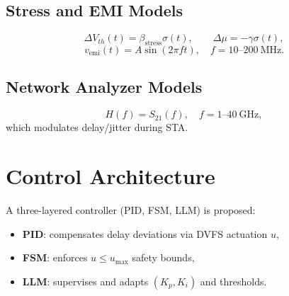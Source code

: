 \documentclass[conference]{IEEEtran}
\begin{document}
\subsection{Stress and EMI Models}
\begin{equation}
\Delta V_{th}(t)=\beta_{\mathrm{stress}}\sigma(t),\qquad \Delta\mu=-\gamma\sigma(t),
\end{equation}
\vspace{-6pt}
\begin{equation}
v_{\mathrm{emi}}(t)=A\sin(2\pi f t),\quad f=10\text{--}200~\mathrm{MHz}.
\end{equation}

\subsection{Network Analyzer Models}
\begin{equation}
H(f)=S_{21}(f),\quad f=1\text{--}40~\mathrm{GHz},
\end{equation}
which modulates delay/jitter during STA.

\section{Control Architecture}
A three-layered controller (PID, FSM, LLM) is proposed:
\begin{itemize}
  \item \textbf{PID}: compensates delay deviations via DVFS actuation $u$,
  \item \textbf{FSM}: enforces $u\le u_{\max}$ safety bounds,
  \item \textbf{LLM}: supervises and adapts $(K_p,K_i)$ and thresholds.
\end{itemize}
\end{document}
